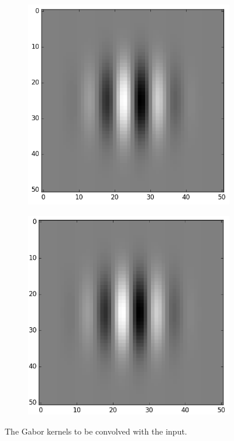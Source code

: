 \documentclass[]{article}
\begin{document}
\begin{figure}
  \label{fig:gabor-kernel}
  \centering
    \begin{subfigure}[t]{0.49\textwidth}
      \centering
      \includegraphics[width=0.99\linewidth]{gabor_kernel.png}
    \end{subfigure}
    \begin{subfigure}[t]{0.49\textwidth}
      \centering
      \includegraphics[width=0.99\linewidth]{gabor_kernel2.png}
    \end{subfigure}
    \caption{The Gabor kernels to be convolved with the input.}
\end{figure}
\end{document}
